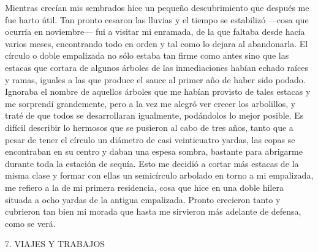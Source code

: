 \documentclass{novela}
\begin{document}
    Mientras crecían mis sembrados hice un pequeño descubrimiento que después me fue harto útil. Tan pronto cesaron las lluvias y el tiempo se estabilizó —cosa que ocurría en noviembre— fui a visitar mi enramada, de la que faltaba desde hacía varios meses, encontrando todo en orden y tal como lo dejara al abandonarla. El círculo o doble empalizada no sólo estaba tan firme como antes sino que las estacas que cortara de algunos árboles de las inmediaciones habían echado raíces y ramas, iguales a las que produce el sauce al primer año de haber sido podado. Ignoraba el nombre de aquellos árboles que me habían provisto de tales estacas y me sorprendí grandemente, pero a la vez me alegró ver crecer los arbolillos, y traté de que todos se desarrollaran igualmente, podándolos lo mejor posible. Es difícil describir lo hermosos que se pusieron al cabo de tres años, tanto que a pesar de tener el círculo un diámetro de casi veinticuatro yardas, las copas se encontraban en su centro y daban una espesa sombra, bastante para abrigarme durante toda la estación de sequía.
    Esto me decidió a cortar más estacas de la misma clase y formar con ellas un semicírculo arbolado en torno a mi empalizada, me refiero a la de mi primera residencia, cosa que hice en una doble hilera situada a ocho yardas de la antigua empalizada. Pronto crecieron tanto y cubrieron tan bien mi morada que hasta me sirvieron más adelante de defensa, como se verá.





    7. VIAJES Y TRABAJOS
\end{document}
